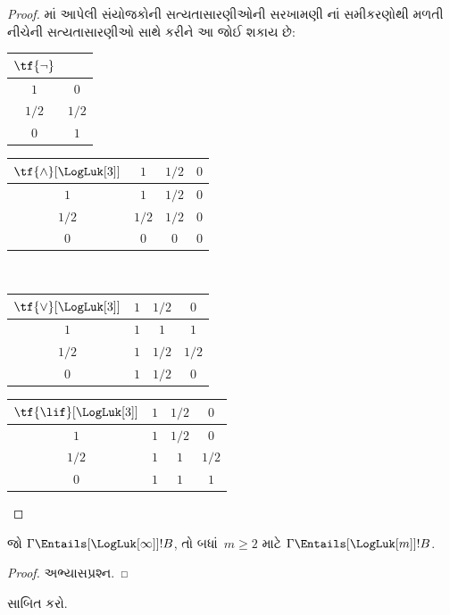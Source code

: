 \documentclass[../../../include/open-logic-section]{subfiles}
\begin{document}
\begin{proof}
  માં આપેલી સંયોજકોની
  સત્યતાસારણીઓની સરખામણી નાં
  સમીકરણોથી મળતી નીચેની સત્યતાસારણીઓ સાથે કરીને આ જોઈ શકાય છે:
  \begin{center}
    \begin{tabular}{c|c}
      $\tf{\lnot}$ & \\
      \hline
      $1$ & $0$ \\
      $1/2$ & $1/2$ \\
      $0$ & $1$
    \end{tabular}
    \quad
    \begin{tabular}{c|ccc}
      $\tf{\land}[\LogLuk[3]]$ & $1$ & $1/2$ & $0$ \\
      \hline
      $1$ & $1$ & $1/2$ & $0$ \\
      $1/2$ & $1/2$ & $1/2$ & $0$\\
      $0$ & $0$ & $0$ & $0$
    \end{tabular}
    \\[2ex]
    \begin{tabular}{c|ccc}
      $\tf{\lor}[\LogLuk[3]]$ & $1$ & $1/2$ & $0$ \\
      \hline
      $1$ & $1$ & $1$ & $1$ \\
      $1/2$ & $1$ & $1/2$ & $1/2$ \\
      $0$ & $1$ & $1/2$ & $0$
    \end{tabular}
    \quad
    \begin{tabular}{c|ccc}
      $\tf{\lif}[\LogLuk[3]]$ & $1$ & $1/2$ & $0$ \\
      \hline
      $1$ & $1$ & $1/2$ & $0$ \\
      $1/2$ & $1$ & $1$ & $1/2$ \\
      $0$ & $1$ & $1$ & $1$
    \end{tabular}
  \end{center}
\end{proof}

\begin{prop}
  જો $\Gamma \Entails[\LogLuk[\infty]] !B$, તો બધાં~$m \ge 2$
  માટે $\Gamma \Entails[\LogLuk[m]] !B$.
\end{prop}

\begin{proof}
  અભ્યાસપ્રશ્ન.
\end{proof}

\begin{prob}
   સાબિત કરો.
\end{prob}
\end{document}
